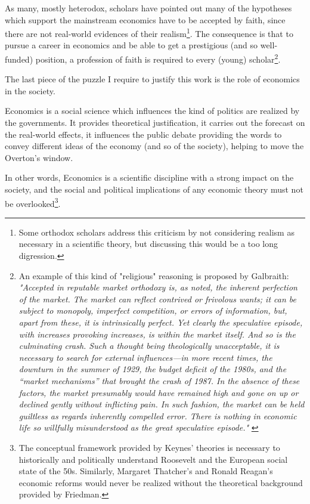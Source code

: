 \documentclass[a4paper, 11pt, headings=standardclasses, tablecaptionsbelow]{scrartcl}
\begin{document}
As many, mostly heterodox, scholars have pointed out many of the hypotheses which support the mainstream economics have to be accepted by faith, since there are not real-world evidences of their realism\footnote{Some orthodox scholars address this criticism by not considering realism as necessary in a scientific theory, but discussing this would be a too long digression.}.
The consequence is that to pursue a career in economics and be able to get a prestigious (and so well-funded) position, a profession of faith is required to every (young) scholar\footnote{An example of this kind of "religious" reasoning is proposed by Galbraith: \textit{"Accepted in reputable market orthodoxy is, as noted, the inherent perfection of the market. The market can reflect contrived or frivolous wants; it can be subject to monopoly, imperfect competition, or errors of information, but, apart from these, it is intrinsically perfect. Yet clearly the speculative episode, with increases provoking increases, is within the market itself. And so is the culminating crash. Such a thought being theologically unacceptable, it is necessary to search for external influences—in more recent times, the downturn in the summer of 1929, the budget deficit of the 1980s, and the “market mechanisms” that brought the crash of 1987. In the absence of these factors, the market presumably would have remained high and gone on up or declined gently without inflicting pain. In such fashion, the market can be held guiltless as regards inherently compelled error. There is nothing in economic life so willfully misunderstood as the great speculative episode."} \parencite{galbraith1994}}.

The last piece of the puzzle I require to justify this work is the role of economics in the society.

Economics is a social science which influences the kind of politics are realized by the governments. It provides theoretical justification, it carries out the forecast on the real-world effects, it influences the public debate providing the words to convey different ideas of the economy (and so of the society), helping to move the Overton's window.

In other words, Economics is a scientific discipline with a strong impact on the society, and the social and political implications of any economic theory must not be overlooked\footnote{The conceptual framework provided by Keynes' theories is necessary to historically and politically understand Roosevelt and the European social state of the 50s. Similarly, Margaret Thatcher's and Ronald Reagan's economic reforms would never be realized without the theoretical background provided by Friedman.}.
\end{document}
